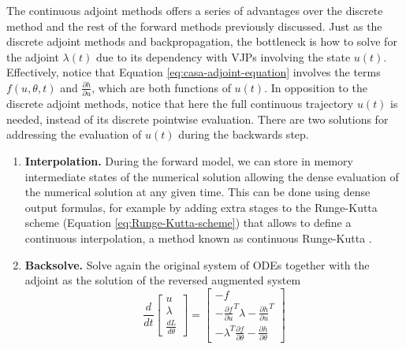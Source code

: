 The continuous adjoint methods offers a series of advantages over the discrete method and the rest of the forward methods previously discussed. 
Just as the discrete adjoint methods and backpropagation, the bottleneck is how to solve for the adjoint $\lambda(t)$ due to its dependency with VJPs involving the state $u(t)$.
Effectively, notice that Equation \eqref{eq:casa-adjoint-equation} involves the terms $f(u, \theta, t)$ and $\frac{\partial h}{\partial u}$, which are both functions of $u(t)$. 
In opposition to the discrete adjoint methods, notice that here the full continuous trajectory $u(t)$ is needed, instead of its discrete pointwise evaluation. 
There are two solutions for addressing the evaluation of $u(t)$ during the backwards step.
\begin{enumerate}[label=(\roman*)]
    \item \textbf{Interpolation.} During the forward model, we can store in memory intermediate states of the numerical solution allowing the dense evaluation of the numerical solution at any given time. 
    This can be done using dense output formulas, for example by adding extra stages to the Runge-Kutta scheme (Equation \eqref{eq:Runge-Kutta-scheme}) that allows to define a continuous interpolation, a method known as continuous Runge-Kutta \cite{hairer-solving-2, Alexe_Sandu_2009}. 
    \item \textbf{Backsolve.} Solve again the original system of ODEs together with the adjoint as the solution of the reversed augmented system \cite{chen_neural_2019}
    \begin{equation}
    \frac{d}{dt}
    \begin{bmatrix}
       u \\
       \lambda \\
       \frac{dL}{d\theta}
    \end{bmatrix}
    = 
    \begin{bmatrix}
       -f \\
       - \frac{\partial f}{\partial u}^T \lambda - \frac{\partial h}{\partial u}^T \\
       - \lambda^T \frac{\partial f}{\partial \theta} - \frac{\partial h}{\partial \theta}
    \end{bmatrix}

\end{equation}
\end{enumerate}

